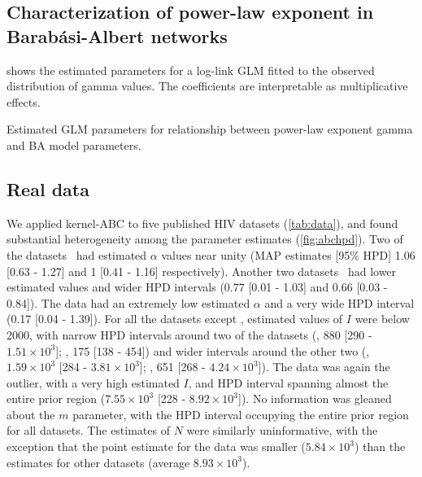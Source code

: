 \subsection{Characterization of power-law exponent in Barab\'asi-Albert networks}

 shows the estimated parameters for a log-link \gls{GLM} fitted
to the observed distribution of \gls{gamma} values. The coefficients are
interpretable as multiplicative effects.

\begin{table}
    \centering
    
    \caption{Estimated \gls{GLM} parameters for relationship between power-law
    exponent \gls{gamma} and \gls{BA} model parameters.}
    \label{tab:glm}
\end{table}

\subsection{Real data}



We applied kernel-ABC to five published HIV datasets (\cref{tab:data}),
and found substantial heterogeneity among the parameter estimates
(\cref{fig:abchpd}). Two of the datasets~\autocite{niculescu2015recent,
wang2015targeting} had estimated $\alpha$ values near unity (MAP estimates
[95\% HPD] 
  1.06 
  [0.63 - 
   1.27]
and
  1 
  [0.41 -
   1.16] respectively). 
Another two datasets~\autocite{li2015hiv, cuevas2009hiv} had lower estimated
values and wider HPD intervals
  (0.77 
  [0.01 - 
  1.03]
and
  0.66 
  [0.03 -
   0.84]). 
The \textcite{novitsky2014impact} data had an extremely low estimated $\alpha$
and a very wide HPD interval
  (0.17 
  [0.04 -
   1.39]). 
For all the datasets except \citeauthor{novitsky2014impact}, estimated values of
$I$ were below 2000, with narrow HPD intervals around two of the
datasets
  (\citeauthor{cuevas2009hiv}, 880 
  [290 -
   \ensuremath{1.51\times 10^{3}}];
   \citeauthor{niculescu2015recent}, 175
  [138 - 
   454])
and wider intervals around the other two
  (\citeauthor{li2015hiv}, \ensuremath{1.59\times 10^{3}} 
  [284 -
   \ensuremath{3.81\times 10^{3}}];
   \citeauthor{wang2015targeting}, 651
  [268 - 
   \ensuremath{4.24\times 10^{3}}]).
The \citeauthor{novitsky2014impact} data was again the outlier, with a very high
estimated $I$, and HPD interval spanning almost the entire prior region
  (\ensuremath{7.55\times 10^{3}} 
  [228 -
   \ensuremath{8.92\times 10^{3}}]).
No information was gleaned about the $m$ parameter, with the HPD interval
occupying the entire prior region for all datasets. The estimates of $N$ were
similarly uninformative, with the exception that the point estimate for the
\citeauthor{wang2015targeting} data was smaller
  (\ensuremath{5.84\times 10^{3}})
than the estimates for other datasets
 (average \ensuremath{8.93\times 10^{3}}).

